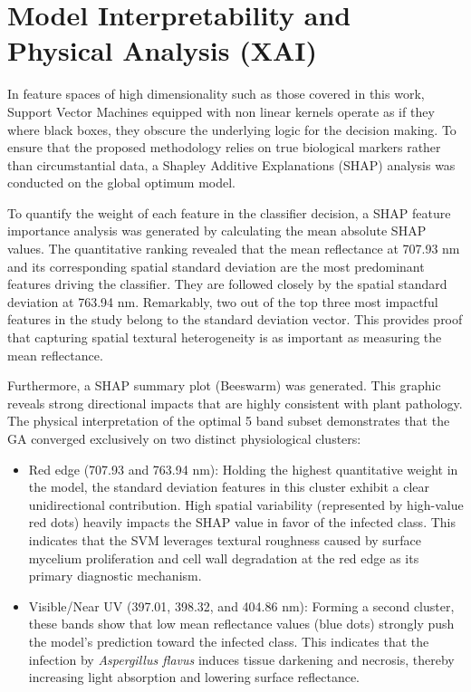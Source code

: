 \documentclass[runningheads]{llncs}
\begin{document}
\section{Model Interpretability and Physical Analysis (XAI)}
In feature spaces of high dimensionality such as those covered in this work, Support Vector Machines equipped with non linear kernels operate as if they where black boxes, they obscure the underlying logic for the decision making. 
To ensure that the proposed methodology relies on true biological markers rather than circumstantial data, a Shapley Additive Explanations (SHAP) analysis was conducted on the global optimum model. 

To quantify the weight of each feature in the classifier decision, a SHAP feature importance analysis was generated by calculating the mean absolute SHAP values.
The quantitative ranking revealed that the mean reflectance at 707.93 nm and its corresponding spatial standard deviation are the most predominant features driving the classifier.
They are followed closely by the spatial standard deviation at 763.94 nm. Remarkably, two out of the top three most impactful features in the study belong to the standard deviation vector. 
This provides proof that capturing spatial textural heterogeneity is as important as measuring the mean reflectance. 

Furthermore, a SHAP summary plot (Beeswarm) was generated. This graphic reveals strong directional impacts that are highly consistent with plant pathology. 
The physical interpretation of the optimal 5 band subset demonstrates that the GA converged exclusively on two distinct physiological clusters: 

\begin{itemize}
    \item Red edge (707.93 and 763.94 nm): Holding the highest quantitative weight in the model, the standard deviation features in this cluster exhibit a clear unidirectional contribution. High spatial variability (represented by high-value red dots) heavily impacts the SHAP value in favor of the infected class. This indicates that the SVM leverages textural roughness caused by surface mycelium proliferation and cell wall degradation at the red edge as its primary diagnostic mechanism.
    \item Visible/Near UV (397.01, 398.32, and 404.86 nm): Forming a second cluster, these bands show that low mean reflectance values (blue dots) strongly push the model's prediction toward the infected class. This indicates that the infection by \textit{Aspergillus flavus} induces tissue darkening and necrosis, thereby increasing light absorption and lowering surface reflectance.
\end{itemize}
\end{document}

